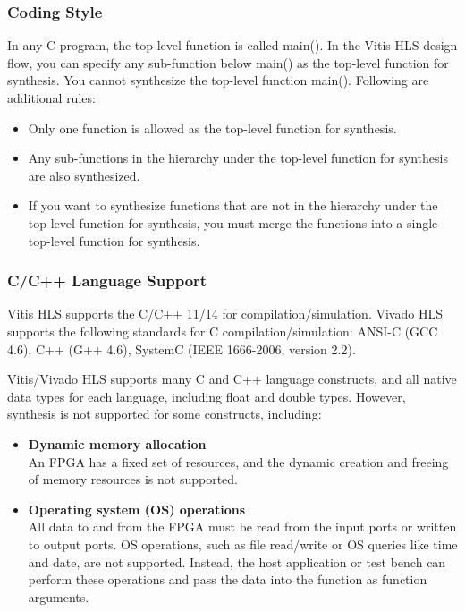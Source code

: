 \subsubsection{Coding Style}
In any C program, the top-level function is called main(). In the Vitis HLS design flow, you can specify any sub-function below main() as the top-level function for synthesis. You cannot
synthesize the top-level function main(). Following are additional rules:
\begin{itemize}
  \item Only one function is allowed as the top-level function for synthesis.
  \item Any sub-functions in the hierarchy under the top-level function for synthesis are also synthesized.
  \item If you want to synthesize functions that are not in the hierarchy under the top-level function for synthesis, you must merge the functions into a single top-level function for synthesis.
\end{itemize}

\subsubsection{C/C++ Language Support}
Vitis HLS supports the C/C++ 11/14 for compilation/simulation. 
Vivado HLS supports the following standards for C compilation/simulation: ANSI-C (GCC 4.6), C++ (G++ 4.6), SystemC (IEEE 1666-2006, version 2.2).

Vitis/Vivado HLS supports many C and C++ language constructs, and all native data types for each language, including float and double types. However, synthesis is not supported for some constructs, including:
\begin{itemize}
  \item \textbf{Dynamic memory allocation}\\  An FPGA has a fixed set of resources, and the dynamic creation and freeing of memory resources is not supported.
  \item \textbf{Operating system (OS) operations}\\  All data to and from the FPGA must be read from the input ports or written to output ports. OS operations, such as file read/write or OS queries like time and date, are not supported. Instead, the host application or test bench can perform these operations and pass the data into the function as function arguments.
\end{itemize}


